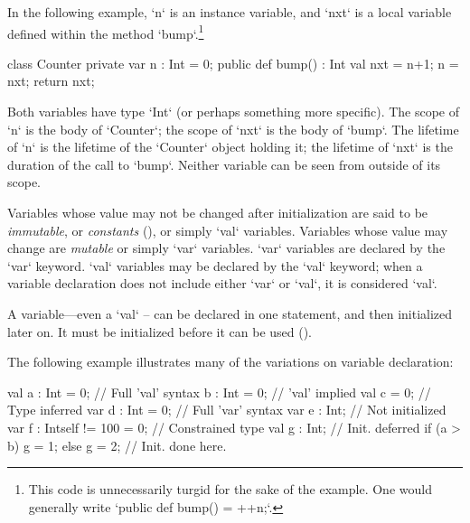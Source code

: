 \begin{ex}
In the following example, 
\xcd`n` is an instance variable, and \xcd`nxt` is a
local variable defined within the method \xcd`bump`.\footnote{This code is
unnecessarily turgid for the sake of the example.  One would generally write
\xcd`public def bump() = ++n;`.   }
\begin{xten}
class Counter {
  private var n : Int = 0;
  public def bump() : Int {
    val nxt = n+1;
    n = nxt;
    return nxt;
    }
}
\end{xten}
Both variables have type \xcd`Int` (or
perhaps something more specific).    The scope of \xcd`n` is the body of
\xcd`Counter`; the scope of \xcd`nxt` is the body of \xcd`bump`.  The
lifetime of \xcd`n` is the lifetime of the \xcd`Counter` object holding it;
the lifetime of \xcd`nxt` is the duration of the call to \xcd`bump`. Neither
variable can be seen from outside of its scope.
\end{ex}
\label{exploded-syntax}
\label{VariableDeclarations}


Variables whose value may not be changed after initialization are said to be
{\em immutable}, or {\em constants} (), or simply
\xcd`val` variables. Variables whose value may change are {\em mutable} or
simply \xcd`var` variables. \xcd`var` variables are declared by the \xcd`var`
keyword. \xcd`val` variables may be declared by the \xcd`val` keyword; when a
variable declaration does not include either \xcd`var` or \xcd`val`, it is
considered \xcd`val`. 

A variable---even a \xcd`val` -- can be declared in one statement, and then
initialized later on.  It must be initialized before it can be used
().  


\begin{ex}
The following example illustrates many of the variations on variable
declaration: 
\begin{xten}
val a : Int = 0;               // Full 'val' syntax
b : Int = 0;                   // 'val' implied
val c = 0;                     // Type inferred
var d : Int = 0;               // Full 'var' syntax
var e : Int;                   // Not initialized
var f : Int{self != 100} = 0;  // Constrained type
val g : Int;                   // Init. deferred
if (a > b) g = 1; else g = 2;  // Init. done here.
\end{xten}
\end{ex}





